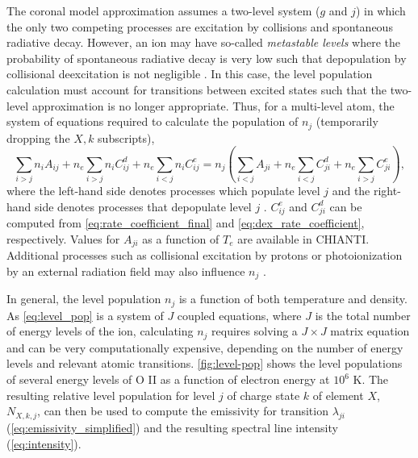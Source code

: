 The coronal model approximation assumes a two-level system ($g$ and $j$) in which the only two competing processes are excitation by collisions and spontaneous radiative decay. However, an ion may have so-called \textit{metastable levels} where the probability of spontaneous radiative decay is very low such that depopulation by collisional deexcitation is not negligible \citep{phillips_ultraviolet_2008,del_zanna_solar_2018}. In this case, the level population calculation must account for transitions between excited states such that the two-level approximation is no longer appropriate. Thus, for a multi-level atom, the system of equations required to calculate the population of $n_j$ (temporarily dropping the $X,k$ subscripts),
\begin{equation}\label{eq:level_pop}
\sum_{i>j}n_iA_{ij} + n_e\sum_{i>j}n_iC_{ij}^d + n_e\sum_{i<j}n_iC_{ij}^e
= n_j\left(\sum_{i<j}A_{ji} + n_e\sum_{i<j}C_{ji}^d + n_e\sum_{i>j}C_{ji}^e\right),
\end{equation}
where the left-hand side denotes processes which populate level $j$ and the right-hand side denotes processes that depopulate level $j$ \citep{del_zanna_solar_2018}. $C_{ij}^e$ and $C_{ji}^d$ can be computed from \autoref{eq:rate_coefficient_final} and \autoref{eq:dex_rate_coefficient}, respectively. Values for $A_{ji}$ as a function of $T_e$ are available in CHIANTI. Additional processes such as collisional excitation by protons or photoionization by an external radiation field may also influence $n_j$ \citep[see sections 3.4.1 and 3.4.2 of][]{del_zanna_solar_2018}.

In general, the level population $n_j$ is a function of both temperature and density. As \autoref{eq:level_pop} is a system of $J$ coupled equations, where $J$ is the total number of energy levels of the ion, calculating $n_j$ requires solving a $J\times J$ matrix equation and can be very computationally expensive, depending on the number of energy levels and relevant atomic transitions. \autoref{fig:level-pop} shows the level populations of several energy levels of O II as a function of electron energy at $10^6$ K. The resulting relative level population for level $j$ of charge state $k$ of element $X$, $N_{X,k,j}$, can then be used to compute the emissivity for transition $\lambda_{ji}$ (\autoref{eq:emissivity_simplified}) and the resulting spectral line intensity (\autoref{eq:intensity}).

